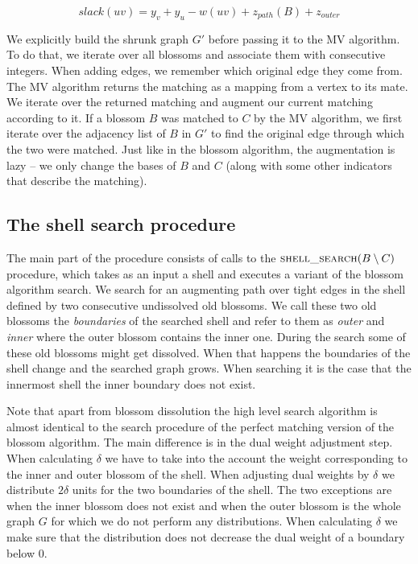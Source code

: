 \[ slack(uv) = y_v + y_u - w(uv) + z_{path}(B) + z_{outer} \]

We explicitly build the shrunk graph $G'$ before passing it to the MV algorithm. To do that, we iterate over all blossoms and associate them with consecutive integers. When adding edges, we remember which original edge they come from. The MV algorithm returns the matching as a mapping from a vertex to its mate. We iterate over the returned matching and augment our current matching according to it. If a blossom $B$ was matched to $C$ by the MV algorithm, we first iterate over the adjacency list of $B$ in $G'$ to find the original edge through which the two were matched. Just like in the blossom algorithm, the augmentation is lazy – we only change the bases of $B$ and $C$ (along with some other indicators that describe the matching).

\subsection{The shell search procedure}

The main part of the procedure consists of calls to the $\textsc{shell\_search}(B \setminus C)$ procedure, which takes as an input a shell and executes a variant of the blossom algorithm search. We search for an augmenting path over tight edges in the shell defined by two consecutive undissolved old blossoms. We call these two old blossoms the \textit{boundaries} of the searched shell and refer to them as \textit{outer} and \textit{inner} where the outer blossom contains the inner one. During the search some of these old blossoms might get dissolved. When that happens the boundaries of the shell change and the searched graph grows. When searching it is the case that the innermost shell the inner boundary does not exist. 

Note that apart from blossom dissolution the high level search algorithm is almost identical to the search procedure of the perfect matching version of the blossom algorithm. The main difference is in the dual weight adjustment step. When calculating $\delta$ we have to take into the account the weight corresponding to the inner and outer blossom of the shell. When adjusting dual weights by $\delta$ we distribute $2\delta$ units for the two boundaries of the shell. The two exceptions are when the inner blossom does not exist and when the outer blossom is the whole graph $G$ for which we do not perform any distributions. When calculating $\delta$ we make sure that the distribution does not decrease the dual weight of a boundary below $0$.


